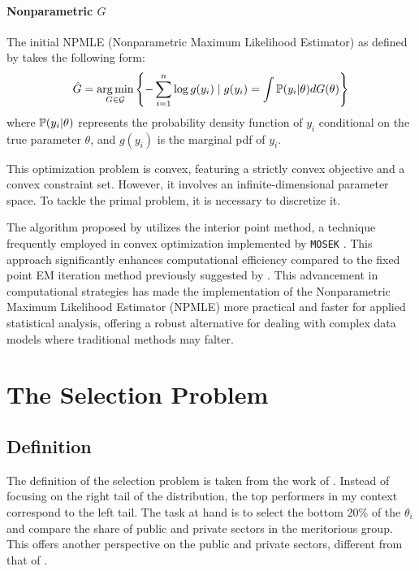 \documentclass[12pt]{article}
\begin{document}
\paragraph{Nonparametric $G$}

The initial NPMLE (Nonparametric Maximum Likelihood Estimator) as defined by
\citet{kiefer1956consistency} takes the following form:
\begin{equation*}
    \hat{G} = \operatorname*{arg\,min}_{G \in \mathcal{G}} \left\{-\sum_{i=1}^{n}\log g(y_i) \mid g(y_i) = \int \mathbb{P}(y_i |\theta) dG(\theta) \right\}
\end{equation*}
where \( \mathbb{P}(y_i |\theta) \) represents the probability density function of \( y_i \) conditional on the true parameter \( \theta \), and \( g(y_i) \) is the marginal pdf of \( y_i \).

This optimization problem is convex, featuring a strictly convex objective and
a convex constraint set. However, it involves an infinite-dimensional parameter
space. To tackle the primal problem, it is necessary to discretize it.

The algorithm proposed by \citet{koenker2014convex} utilizes the interior point
method, a technique frequently employed in convex optimization implemented by
\verb+MOSEK+ \citep{andersen2010mosek}. This approach significantly enhances
computational efficiency compared to the fixed point EM iteration method
previously suggested by \citet{jiang2009general}. This advancement in
computational strategies has made the implementation of the Nonparametric
Maximum Likelihood Estimator (NPMLE) more practical and faster for applied
statistical analysis, offering a robust alternative for dealing with complex
data models where traditional methods may falter.


\section{The Selection Problem}
\subsection{Definition}
The definition of the selection problem is taken from the work of
\citet{gu2023invidious}. Instead of focusing on the right tail of the
distribution, the top performers in my context correspond to the left tail. The
task at hand is to select the bottom 20\% of the \( \theta_i \) and compare the
share of public and private sectors in the meritorious group. This offers
another perspective on the public and private sectors, different from that of
\citet{croiset2024hospitals}.
\end{document}
